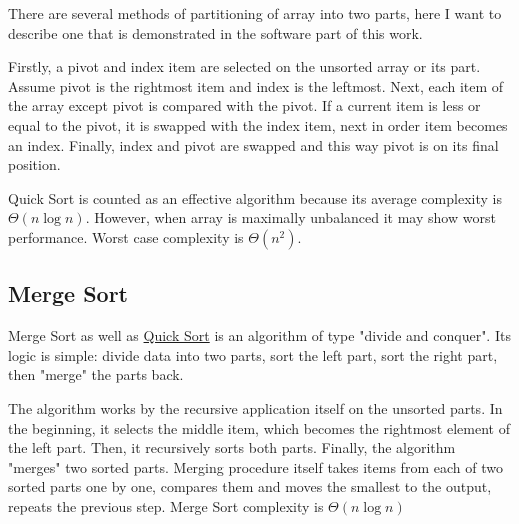 \documentclass[
  field=inf,
  biblatex,
  language=english,
  glossaries,
  theorems=false,
  sourcecodes=false,
  index
]{kidiplom}
\begin{document}
There are several methods of partitioning of array into two parts, here I want to describe one that is demonstrated in the software part of this work.

Firstly, a pivot and index item are selected on the unsorted array or its part. Assume pivot is the rightmost item and index is the leftmost. Next, each item of the array except pivot is compared with the pivot. If a current item is less or equal to the pivot, it is swapped with the index item, next in order item becomes an index. Finally, index and pivot are swapped and this way pivot is on its final position.

Quick Sort is counted as an effective algorithm because its average complexity is $\Theta(n \log n)$. However, when array is maximally unbalanced it may show worst performance. Worst case complexity is $\Theta(n^2)$.

\subsection{Merge Sort}
\label{sec:mergesort}

Merge Sort as well as \hyperref[sec:quicksort]{Quick Sort} is an algorithm of type "divide and conquer". Its logic is simple: divide data into two parts, sort the left part, sort the right part, then "merge" the parts back.

The algorithm works by the recursive application itself on the unsorted parts. In the beginning, it selects the middle item, which becomes the rightmost element of the left part. Then, it recursively sorts both parts. Finally, the algorithm "merges" two sorted parts. Merging procedure itself takes items from each of two sorted parts one by one, compares them and moves the smallest to the output, repeats the previous step. Merge Sort complexity is $\Theta(n \log n)$
\end{document}

